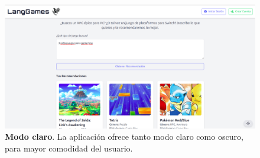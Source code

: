 \begin{figure}[H]
	\centering
	\includegraphics[width=1\linewidth]{imagenes/homeClaro.png}
	\caption[\textbf{Modo claro}.]{\textbf{Modo claro}. La aplicación ofrece tanto modo claro como oscuro, para mayor comodidad del usuario.}
	\label{imagen-home-claro}
\end{figure}

